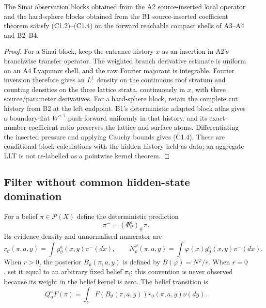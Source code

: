 \begin{proposition}
\label{prop:r23-c1-observation}
The Sinai observation blocks obtained from the A2 source-inserted local
operator and the hard-sphere blocks obtained from the B1 source-inserted
coefficient theorem satisfy (C1.2)--(C1.4) on the forward reachable compact
shells of A3--A4 and B2--B4.
\end{proposition}

\begin{proof}
For a Sinai block, keep the entrance history $x$ as an insertion in A2's
branchwise transfer operator.  The weighted branch derivative estimate is
uniform on an A4 Lyapunov shell, and the raw Fourier majorant is integrable.
Fourier inversion therefore gives an $L^1$ density on the continuous roof
stratum and counting densities on the three lattice strata, continuously in
$x$, with three source/parameter derivatives.  For a hard-sphere block, retain
the complete cut history from B2 at the left endpoint.  B1's deterministic
adapted block atlas gives a boundary-flat $W^{s,1}$ push-forward uniformly in
that history, and its exact-number coefficient ratio preserves the lattice and
surface atoms.  Differentiating the inserted pressure and applying Cauchy
bounds gives (C1.4).  These are conditional block calculations with the hidden
history held as data; an aggregate LLT is not re-labelled as a pointwise
kernel theorem.
\end{proof}

\subsection{Filter without common hidden-state domination}

For a belief $\pi\in\mathcal P(X)$ define the deterministic prediction
\[
 \pi^-=(\Phi_\vartheta^a)_\#\pi.                          \tag{C1.5}
\]
Its evidence density and unnormalised numerator are
\[
 r_\vartheta(\pi,a,y)=\int g_\vartheta^a(x,y)\pi^-(dx),
 \qquad
 N_\vartheta^{\varphi}(\pi,a,y)
 =\int\varphi(x)g_\vartheta^a(x,y)\pi^-(dx).             \tag{C1.6}
\]
When $r>0$, the posterior $B_\vartheta(\pi,a,y)$ is defined by
$B(\varphi)=N^\varphi/r$.  When $r=0$, set it equal to an arbitrary fixed
belief $\pi_\dagger$; this convention is never observed because its weight in
the belief kernel is zero.  The belief transition is
\[
 Q_\vartheta^aF(\pi)
 =\int_YF(B_\vartheta(\pi,a,y))
       r_\vartheta(\pi,a,y)\nu(dy).                      \tag{C1.7}
\]

